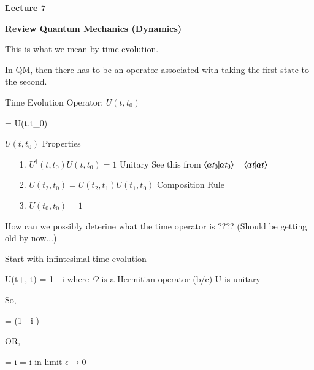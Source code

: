 
\usepackage{fancyhdr}

\fancyhf{}


\thispagestyle{fancy}

\begin{center}
{\huge \textbf{Lecture 7}}
\end{center}

{\fontsize{14}{16}\selectfont

\textbf{\underline{Review Quantum Mechanics (Dynamics)}}

\be
{} \rightarrow {}
\ee

This is what we mean by time evolution.  

In QM, then there has to be an operator associated with taking the first state to the second. 

Time Evolution Operator:  $U(t,t_0)$


\be
{} = U(t,t_0) 
\ee

$U(t,t_0)$ Properties
\begin{itemize}
\item[1.] $U^\dagger(t,t_0)U(t,t_0) = 1$ Unitary  See this from $\braket{\alpha t_0|\alpha t_0} = \braket{\alpha t|\alpha t}$
\item[2.] $U(t_2, t_0) = U(t_2,t_1)U(t_1,t_0)$ Composition Rule
\item[3.] $U(t_0, t_0) = 1$
\end{itemize}


How can we possibly deterine what the time operator is ????
(Should be getting old by now...)


\underline{Start with infintesimal time evolution}

\be
U(t+\epsilon, t)  = 1 - i\Omega \epsilon
\ee
where $\Omega$ is a Hermitian operator (b/c) U is unitary


So, 

\be
{} = (1 - i \epsilon \Omega ) 
\ee

OR,

\be
\Omega {} = i  = i  
\ee
in limit $\epsilon \rightarrow 0$


}
